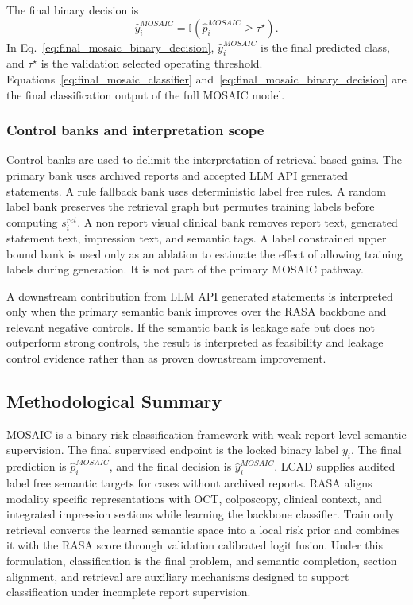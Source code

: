 The final binary decision is
\begin{equation}
\hat{y}_i^{MOSAIC}=\mathbb{I}(\hat{p}_i^{MOSAIC}\geq\tau^{\star}).
\label{eq:final_mosaic_binary_decision}
\end{equation}
In Eq.~\eqref{eq:final_mosaic_binary_decision}, $\hat{y}_i^{MOSAIC}$ is the final predicted class, and $\tau^{\star}$ is the validation selected operating threshold. Equations~\eqref{eq:final_mosaic_classifier} and~\eqref{eq:final_mosaic_binary_decision} are the final classification output of the full MOSAIC model.

\subsubsection{Control banks and interpretation scope}
\label{subsubsec:control_banks_interpretation_scope}

Control banks are used to delimit the interpretation of retrieval based gains. The primary bank uses archived reports and accepted LLM API generated statements. A rule fallback bank uses deterministic label free rules. A random label bank preserves the retrieval graph but permutes training labels before computing $s_i^{ret}$. A non report visual clinical bank removes report text, generated statement text, impression text, and semantic tags. A label constrained upper bound bank is used only as an ablation to estimate the effect of allowing training labels during generation. It is not part of the primary MOSAIC pathway.

A downstream contribution from LLM API generated statements is interpreted only when the primary semantic bank improves over the RASA backbone and relevant negative controls. If the semantic bank is leakage safe but does not outperform strong controls, the result is interpreted as feasibility and leakage control evidence rather than as proven downstream improvement.

\subsection{Methodological Summary}
\label{subsec:methodological_summary}

MOSAIC is a binary risk classification framework with weak report level semantic supervision. The final supervised endpoint is the locked binary label $y_i$. The final prediction is $\hat{p}_i^{MOSAIC}$, and the final decision is $\hat{y}_i^{MOSAIC}$. LCAD supplies audited label free semantic targets for cases without archived reports. RASA aligns modality specific representations with OCT, colposcopy, clinical context, and integrated impression sections while learning the backbone classifier. Train only retrieval converts the learned semantic space into a local risk prior and combines it with the RASA score through validation calibrated logit fusion. Under this formulation, classification is the final problem, and semantic completion, section alignment, and retrieval are auxiliary mechanisms designed to support classification under incomplete report supervision.
